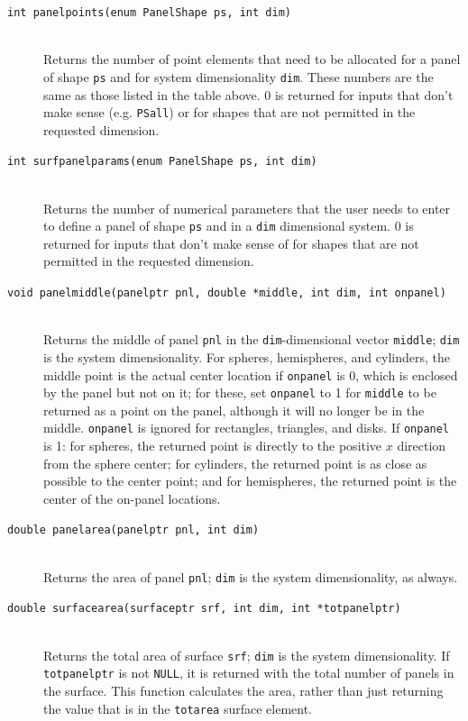 \documentclass {scrbook}
\newcommand {\ttt} {\texttt}
\begin{document}
\begin{description}
\item[\ttt{int panelpoints(enum PanelShape ps, int dim)}]
\hfill \\
Returns the number of point elements that need to be allocated for a panel of shape \ttt{ps} and for system dimensionality \ttt{dim}. These numbers are the same as those listed in the table above. 0 is returned for inputs that don't make sense (e.g. \ttt{PSall}) or for shapes that are not permitted in the requested dimension.

\item[\ttt{int surfpanelparams(enum PanelShape ps, int dim)}]
\hfill \\
Returns the number of numerical parameters that the user needs to enter to define a panel of shape \ttt{ps} and in a \ttt{dim} dimensional system. 0 is returned for inputs that don't make sense of for shapes that are not permitted in the requested dimension.

\item[\ttt{void panelmiddle(panelptr pnl, double *middle, int dim, int onpanel)}]
\hfill \\
Returns the middle of panel \ttt{pnl} in the \ttt{dim}-dimensional vector \ttt{middle}; \ttt{dim} is the system dimensionality. For spheres, hemispheres, and cylinders, the middle point is the actual center location if \ttt{onpanel} is 0, which is enclosed by the panel but not on it; for these, set \ttt{onpanel} to 1 for \ttt{middle} to be returned as a point on the panel, although it will no longer be in the middle. \ttt{onpanel} is ignored for rectangles, triangles, and disks. If \ttt{onpanel} is 1: for spheres, the returned point is directly to the positive $x$ direction from the sphere center; for cylinders, the returned point is as close as possible to the center point; and for hemispheres, the returned point is the center of the on-panel locations.

\item[\ttt{double panelarea(panelptr pnl, int dim)}]
\hfill \\
Returns the area of panel \ttt{pnl}; \ttt{dim} is the system dimensionality, as always.

\item[\ttt{double surfacearea(surfaceptr srf, int dim, int *totpanelptr)}]
\hfill \\
Returns the total area of surface \ttt{srf}; \ttt{dim} is the system dimensionality. If \ttt{totpanelptr} is not \ttt{NULL}, it is returned with the total number of panels in the surface. This function calculates the area, rather than just returning the value that is in the \ttt{totarea} surface element.


\end{description}
\end{document}
